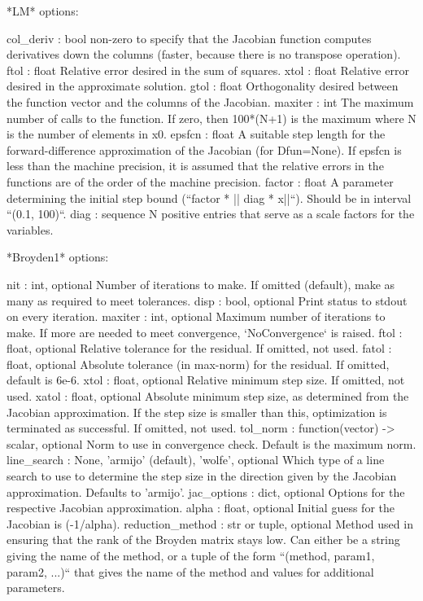 \begin{DoxyVerb}
*LM* options:

    col_deriv : bool
        non-zero to specify that the Jacobian function computes derivatives
        down the columns (faster, because there is no transpose operation).
    ftol : float
        Relative error desired in the sum of squares.
    xtol : float
        Relative error desired in the approximate solution.
    gtol : float
        Orthogonality desired between the function vector and the columns
        of the Jacobian.
    maxiter : int
        The maximum number of calls to the function. If zero, then
        100*(N+1) is the maximum where N is the number of elements in x0.
    epsfcn : float
        A suitable step length for the forward-difference approximation of
        the Jacobian (for Dfun=None). If epsfcn is less than the machine
        precision, it is assumed that the relative errors in the functions
        are of the order of the machine precision.
    factor : float
        A parameter determining the initial step bound
        (``factor * || diag * x||``). Should be in interval ``(0.1, 100)``.
    diag : sequence
        N positive entries that serve as a scale factors for the variables.

*Broyden1* options:

    nit : int, optional
        Number of iterations to make. If omitted (default), make as many
        as required to meet tolerances.
    disp : bool, optional
        Print status to stdout on every iteration.
    maxiter : int, optional
        Maximum number of iterations to make. If more are needed to
        meet convergence, `NoConvergence` is raised.
    ftol : float, optional
        Relative tolerance for the residual. If omitted, not used.
    fatol : float, optional
        Absolute tolerance (in max-norm) for the residual.
        If omitted, default is 6e-6.
    xtol : float, optional
        Relative minimum step size. If omitted, not used.
    xatol : float, optional
        Absolute minimum step size, as determined from the Jacobian
        approximation. If the step size is smaller than this, optimization
        is terminated as successful. If omitted, not used.
    tol_norm : function(vector) -> scalar, optional
        Norm to use in convergence check. Default is the maximum norm.
    line_search : {None, 'armijo' (default), 'wolfe'}, optional
        Which type of a line search to use to determine the step size in
        the direction given by the Jacobian approximation. Defaults to
        'armijo'.
    jac_options : dict, optional
        Options for the respective Jacobian approximation.
            alpha : float, optional
                Initial guess for the Jacobian is (-1/alpha).
            reduction_method : str or tuple, optional
                Method used in ensuring that the rank of the Broyden
                matrix stays low. Can either be a string giving the
                name of the method, or a tuple of the form ``(method,
                param1, param2, ...)`` that gives the name of the
                method and values for additional parameters.


\end{DoxyVerb}
